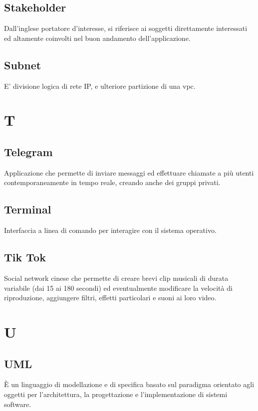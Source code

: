 \documentclass{classes/base}
\begin{document}
        \subsection*{Stakeholder} 
        Dall'inglese portatore d'interesse, si riferisce ai soggetti direttamente interessati ed altamente coinvolti nel buon andamento dell'applicazione.

        \subsection*{Subnet}
        E' divisione logica di rete IP, e ulteriore partizione di una vpc.
        \newpage  
    \section{T}
        \subsection*{Telegram}
        Applicazione che permette di inviare messaggi ed effettuare chiamate a più utenti contemporaneamente in tempo reale, creando anche dei gruppi privati.

        \subsection*{Terminal} 
        Interfaccia a linea di comando per interagire con il sistema operativo.
        
        \subsection*{Tik Tok}
        Social network cinese che permette di creare brevi clip musicali di durata variabile (dai 15 ai 180 secondi) ed eventualmente modificare la velocità di riproduzione, aggiungere filtri, effetti particolari e suoni ai loro video.
        
        \newpage  
    \section{U}
        \subsection*{UML}
		È un linguaggio di modellazione e di specifica basato sul paradigma orientato agli oggetti per l'architettura, la progettazione e l'implementazione di sistemi software.
\end{document}
